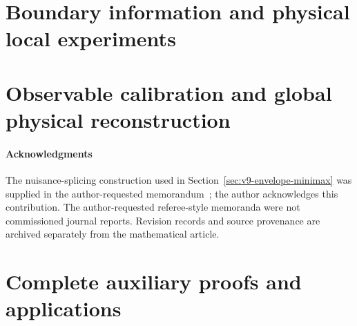\part{Boundary information and physical local experiments}



















\part{Observable calibration and global physical reconstruction}





\subsection*{Acknowledgments}
The nuisance-splicing construction used in
Section~\ref{sec:v9-envelope-minimax} was supplied in the
author-requested memorandum~\cite{A2ReviewV8}; the author acknowledges
this contribution.  The author-requested referee-style memoranda were
not commissioned journal reports.  Revision records and source
provenance are archived separately from the mathematical article.

\appendix
\renewcommand{\thesection}{A.\arabic{section}}
\renewcommand{\theHsection}{appendix.\arabic{section}}
\part{Complete auxiliary proofs and applications}



